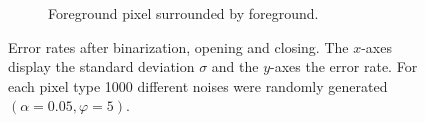 \begin{figure}[H]
\begin{subfigure}[t]{0.48\linewidth}
		\caption{Foreground pixel surrounded by foreground.}
		\label{fig: alpha0.05_phi5_foreground_free}
	\end{subfigure}
	\caption{Error rates after binarization, opening and closing. The $x$-axes display the standard deviation $\sigma$ and the $y$-axes the error rate. For each pixel type 1000 different noises were randomly generated $(\alpha = 0.05, \varphi = 5)$.}
	\label{fig: alpha0.05_phi5}
\end{figure}